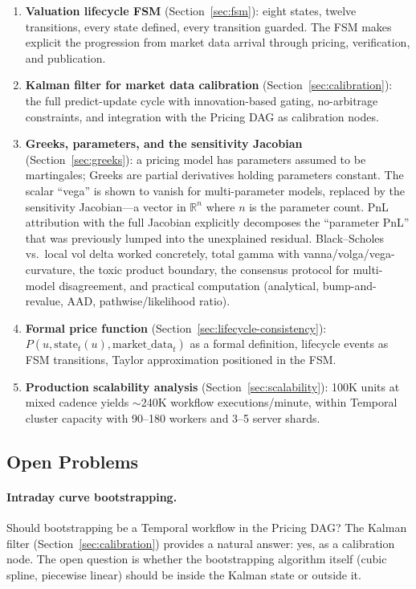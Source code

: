\documentclass[11pt,a4paper]{article}
\begin{document}
\begin{enumerate}
\item \textbf{Valuation lifecycle FSM} (Section~\ref{sec:fsm}): eight states, twelve transitions, every state defined, every transition guarded.  The FSM makes explicit the progression from market data arrival through pricing, verification, and publication.

\item \textbf{Kalman filter for market data calibration} (Section~\ref{sec:calibration}): the full predict-update cycle with innovation-based gating, no-arbitrage constraints, and integration with the Pricing DAG as calibration nodes.

\item \textbf{Greeks, parameters, and the sensitivity Jacobian} (Section~\ref{sec:greeks}): a pricing model has parameters assumed to be martingales; Greeks are partial derivatives holding parameters constant.  The scalar ``vega'' is shown to vanish for multi-parameter models, replaced by the sensitivity Jacobian---a vector in $\mathbb{R}^n$ where $n$ is the parameter count.  PnL attribution with the full Jacobian explicitly decomposes the ``parameter PnL'' that was previously lumped into the unexplained residual.  Black--Scholes vs.\ local vol delta worked concretely, total gamma with vanna/volga/vega-curvature, the toxic product boundary, the consensus protocol for multi-model disagreement, and practical computation (analytical, bump-and-revalue, AAD, pathwise/likelihood ratio).

\item \textbf{Formal price function} (Section~\ref{sec:lifecycle-consistency}): $P(u, \mathrm{state}_t(u), \mathrm{market\_data}_t)$ as a formal definition, lifecycle events as FSM transitions, Taylor approximation positioned in the FSM.

\item \textbf{Production scalability analysis} (Section~\ref{sec:scalability}): 100K units at mixed cadence yields $\sim$240K workflow executions/minute, within Temporal cluster capacity with 90--180 workers and 3--5 server shards.
\end{enumerate}

\subsection{Open Problems}

\paragraph{Intraday curve bootstrapping.}  Should bootstrapping be a Temporal workflow in the Pricing DAG?  The Kalman filter (Section~\ref{sec:calibration}) provides a natural answer: yes, as a calibration node.  The open question is whether the bootstrapping algorithm itself (cubic spline, piecewise linear) should be inside the Kalman state or outside it.
\end{document}
